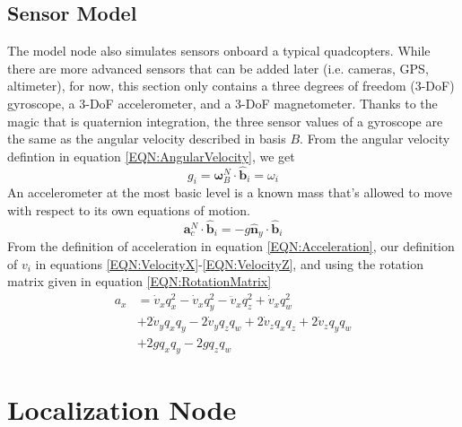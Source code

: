 \documentclass[lettersize,journal]{IEEEtran}
\begin{document}
\subsection{Sensor Model}
The model node also simulates sensors onboard a typical quadcopters.
While there are more advanced sensors that can be added later (i.e. cameras, GPS, altimeter), for now, this section only contains a three degrees of freedom (3-DoF) gyroscope, a 3-DoF accelerometer, and a 3-DoF magnetometer.
Thanks to the magic that is quaternion integration, the three sensor values of a gyroscope are the same as the angular velocity described in basis $B$.
From the angular velocity defintion in equation \ref{EQN:AngularVelocity}, we get
\begin{equation}
  g_i = \boldsymbol\omega^N_B \cdot \mathbf{\hat{b}}_i = \omega_i
\end{equation}
An accelerometer at the most basic level is a known mass that's allowed to move with respect to its own equations of motion.
\begin{equation}
  \mathbf{a}^N_c\cdot \mathbf{\hat{b}}_i=-g\mathbf{\hat{n}}_y\cdot\mathbf{\hat{b}}_i
\end{equation}
From the definition of acceleration in equation \ref{EQN:Acceleration}, our definition of $v_i$ in equations \ref{EQN:VelocityX}-\ref{EQN:VelocityZ},  and using the rotation matrix given in equation \ref{EQN:RotationMatrix}
\begin{align}
  a_x &= \dot{v}_xq_x^2-\dot{v}_xq_y^2-\ddot{v}_xq_z^2+\dot{v}_xq_w^2\nonumber\\
  &+2\dot{v}_yq_xq_y-2\dot{v}_yq_zq_w+ 2\dot{v}_z q_xq_z+2\dot{v}_zq_yq_w \nonumber\\
  &+2gq_xq_y-2gq_zq_w
\end{align}



\section{Localization Node}
\end{document}
